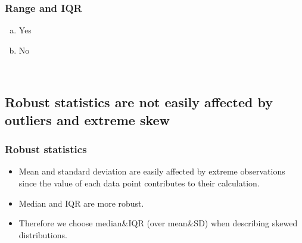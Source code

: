 \documentclass[11pt,containsverbatim,handout,xcolor=xelatex,dvipsnames,table]{beamer}
\newcommand{\solnMult}[1]{#1}
\newcommand{\soln}[1]{}
\begin{document}

\begin{frame}
\frametitle{Range and IQR}


\begin{enumerate}[(a)]
\item \solnMult{Yes}
\item No
\end{enumerate}

\soln{\pause Range = max - min, IQR = Q3 - Q1}

$\:$ \\
\pause


\soln{\pause{IQR}}

\end{frame}


\subsection{Robust statistics are not easily affected by outliers and extreme skew}
\label{mi3}


\begin{frame}
\frametitle{Robust statistics}

\begin{itemize}

\item Mean and standard deviation are easily affected by extreme observations since the value of each data point contributes to their calculation.

\item Median and IQR are more robust.

\item Therefore we choose median\&IQR (over mean\&SD) when describing skewed distributions.

\end{itemize}

\end{frame}


\begin{frame}
\frametitle{}

\vfill


\vfill

\end{frame}
\end{document}
